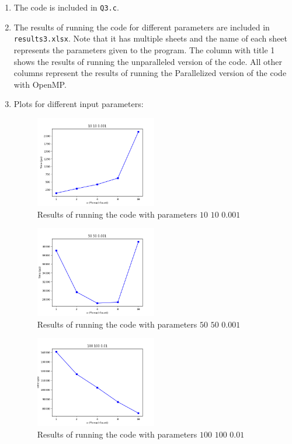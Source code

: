 \documentclass[12pt]{article}
\begin{document}
\begin{enumerate}[label=\alph*.]
	\item 
	The code is included in \Verb+Q3.c+.
	
	\item 
	The results of running the code for different parameters are included in \Verb+results3.xlsx+. Note that it has multiple sheets and the name of each sheet represents the parameters given to the program. The column with title 1 shows the results of running the unparalleled version of the code. All other columns represent the results of running the Parallelized version of the code with OpenMP.

\item
Plots for different input parameters:

\begin{figure}[H]
	\centering
	\includegraphics[width=0.5\textwidth]{./images/Q3/10100001.png}	
	\cprotect\caption{Results of running the code with parameters $10$ $10$ $0.001$}
	\label{fig:1}
\end{figure}

\begin{figure}[H]
	\centering
	\includegraphics[width=0.5\textwidth]{./images/Q3/50500001.png}	
	\cprotect\caption{Results of running the code with parameters $50$ $50$ $0.001$}
	\label{fig:2}
\end{figure}

\begin{figure}[H]
	\centering
	\includegraphics[width=0.5\textwidth]{./images/Q3/100100001.png}	
	\cprotect\caption{Results of running the code with parameters $100$ $100$ $0.01$}
	\label{fig:3}
\end{figure}



\end{enumerate}
\end{document}

